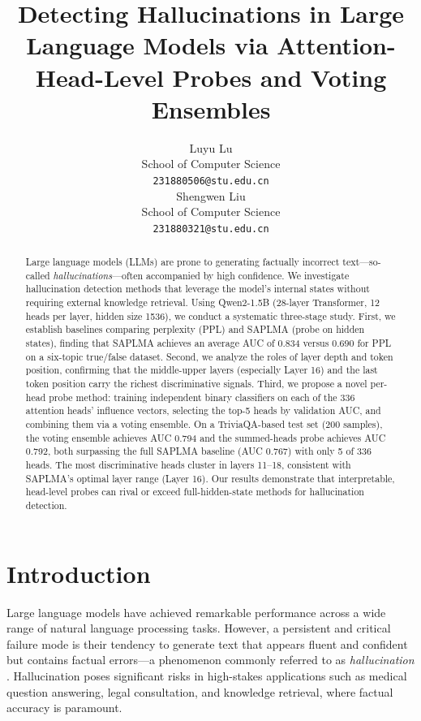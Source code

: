 \documentclass[11pt]{article}
\title{Detecting Hallucinations in Large Language Models via Attention-Head-Level Probes and Voting Ensembles}
\author{
  Luyu Lu \\
  School of Computer Science \\
  \texttt{231880506@stu.edu.cn} \\\And
  Shengwen Liu \\
  School of Computer Science \\
  \texttt{231880321@stu.edu.cn} \\}
\begin{document}
\maketitle

\begin{abstract}
Large language models (LLMs) are prone to generating factually incorrect text---so-called \emph{hallucinations}---often accompanied by high confidence. We investigate hallucination detection methods that leverage the model's internal states without requiring external knowledge retrieval. Using Qwen2-1.5B (28-layer Transformer, 12 heads per layer, hidden size 1536), we conduct a systematic three-stage study. First, we establish baselines comparing perplexity (PPL) and SAPLMA (probe on hidden states), finding that SAPLMA achieves an average AUC of 0.834 versus 0.690 for PPL on a six-topic true/false dataset. Second, we analyze the roles of layer depth and token position, confirming that the middle-upper layers (especially Layer 16) and the last token position carry the richest discriminative signals. Third, we propose a novel per-head probe method: training independent binary classifiers on each of the 336 attention heads' influence vectors, selecting the top-5 heads by validation AUC, and combining them via a voting ensemble. On a TriviaQA-based test set (200 samples), the voting ensemble achieves AUC 0.794 and the summed-heads probe achieves AUC 0.792, both surpassing the full SAPLMA baseline (AUC 0.767) with only 5 of 336 heads. The most discriminative heads cluster in layers 11--18, consistent with SAPLMA's optimal layer range (Layer 16). Our results demonstrate that interpretable, head-level probes can rival or exceed full-hidden-state methods for hallucination detection.
\end{abstract}

\section{Introduction}

Large language models have achieved remarkable performance across a wide range of natural language processing tasks. However, a persistent and critical failure mode is their tendency to generate text that appears fluent and confident but contains factual errors---a phenomenon commonly referred to as \emph{hallucination} \citep{lin2022truthfulqa, bai2022constitutional}. Hallucination poses significant risks in high-stakes applications such as medical question answering, legal consultation, and knowledge retrieval, where factual accuracy is paramount.
\end{document}
